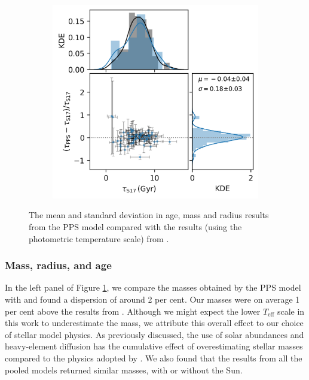\documentclass[fleqn,usenatbib]{mnras}
\newcommand{\teff}{\ensuremath{T_\mathrm{eff}}}
\begin{document}
\begin{figure}
\begin{subfigure}[b]{.33\linewidth}
    \end{subfigure}%
    \begin{subfigure}[b]{.33\linewidth}
        \includegraphics[width=\linewidth]{figures/age_comp.png}
    \end{subfigure}%
    \caption{The mean and standard deviation in age, mass and radius results from the PPS model compared with the results (using the photometric temperature scale) from .}
    \label{fig:comp}
\end{figure}

\subsubsection{Mass, radius, and age}

In the left panel of Figure \ref{fig:comp}, we compare the masses obtained by the PPS model with  and found a dispersion of around 2 per cent. Our masses were on average 1 per cent above the results from . Although we might expect the lower $\teff$ scale in this work to underestimate the mass, we attribute this overall effect to our choice of stellar model physics. As previously discussed, the use of \citet{Asplund.Grevesse.ea2009} solar abundances and heavy-element diffusion has the cumulative effect of overestimating stellar masses compared to the physics adopted by . We also found that the results from all the pooled models returned similar masses, with or without the Sun.
\end{document}

